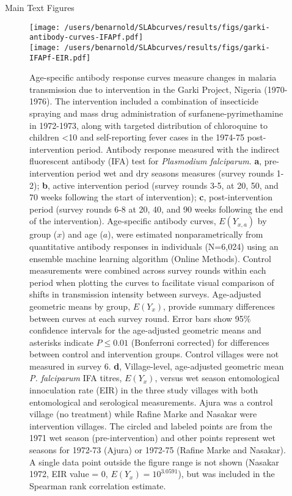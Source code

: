 \documentclass[11pt]{article}
\title{}
\author{}
\date{}
\begin{document}
\begin{center}
{\Large Main Text Figures}
\end{center}
\vspace{50pt}





\begin{figure}[htbp]
\begin{center}
\texttt{[image: /users/benarnold/SLAbcurves/results/figs/garki-antibody-curves-IFAPf.pdf]} \\ 
\texttt{[image: /users/benarnold/SLAbcurves/results/figs/garki-IFAPf-EIR.pdf]}
\begin{minipage}{\textwidth}
\caption{Age-specific antibody response curves measure changes in malaria transmission due to intervention in the Garki Project, Nigeria (1970-1976). The intervention included a combination of insecticide spraying and mass drug administration of surfanene-pyrimethamine in 1972-1973, along with targeted distribution of chloroquine to children <10 and self-reporting fever cases in the 1974-75 post-intervention period. Antibody response measured with the indirect fluorescent antibody (IFA) test for \textit{Plasmodium falciparum}. \textbf{a}, pre-intervention period wet and dry seasons measures (survey rounds 1-2); \textbf{b}, active intervention period (survey rounds 3-5, at 20, 50, and 70 weeks following the start of intervention); \textbf{c}, post-intervention period (survey rounds 6-8 at 20, 40, and 90 weeks following the end of the intervention).  Age-specific antibody curves, $E(Y_{x,a})$ by group ($x$) and age ($a$), were estimated nonparametrically from quantitative antibody responses in individuals (N=6,024) using an ensemble machine learning algorithm (Online Methods). Control measurements were combined across survey rounds within each period when plotting the curves to facilitate visual comparison of shifts in transmission intensity between surveys. Age-adjusted geometric means by group, $E(Y_x)$, provide summary differences between curves at each survey round. Error bars show 95\% confidence intervals for the age-adjusted geometric means and asterisks indicate $P\leq0.01$ (Bonferroni corrected) for differences between control and intervention groups. Control villages were not measured in survey 6. \textbf{d}, Village-level, age-adjusted geometric mean \textit{P. falciparum} IFA titres, $E(Y_x)$, versus wet season entomological innoculation rate (EIR) in the three study villages with both entomological and serological measurements. Ajura was a control village (no treatment) while Rafine Marke and Nasakar were intervention villages.  The circled and labeled points are from the 1971 wet season (pre-intervention) and other points represent wet seasons for 1972-73 (Ajura) or 1972-75 (Rafine Marke and Nasakar). A single data point outside the figure range is not shown (Nasakar 1972, EIR value = 0, $E(Y_x) = 10^{3.0591}$), but was included in the Spearman rank correlation estimate.   }

\end{minipage}
\end{center}
\end{figure}
\end{document}
